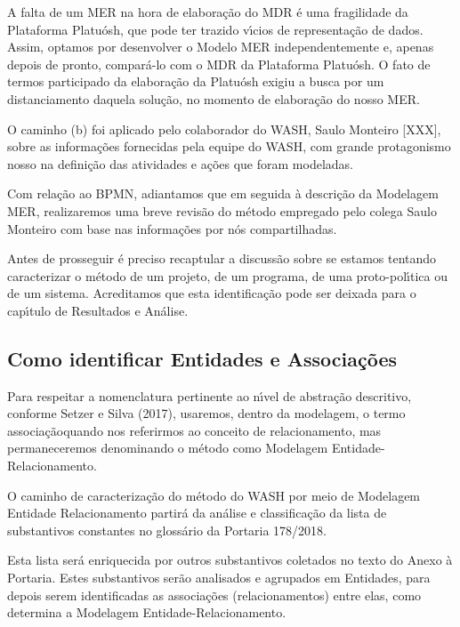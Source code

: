 \documentclass[
12pt,		%
openright,	%
twoside,  %
a4paper,			%
chapter=TITLE,		%
english,			%
french,				%
spanish,			%
brazil				%
]{USPSC-classe/USPSC}
\begin{document}
A falta de um MER na hora de elabora\c{c}\~ao do MDR \'e uma fragilidade da Plataforma Platu\'osh, que pode ter trazido v\'{\i}cios de representa\c{c}\~ao de dados. Assim, optamos por desenvolver o Modelo MER independentemente e, apenas depois de pronto, compar\'a-lo com o MDR da Plataforma Platu\'osh. O fato de termos participado da elabora\c{c}\~ao da Platu\'osh exigiu a busca por um distanciamento daquela solu\c{c}\~ao, no momento de elabora\c{c}\~ao do nosso MER.


O caminho (b) foi aplicado pelo colaborador do WASH, Saulo Monteiro [XXX], sobre as informa\c{c}\~oes fornecidas pela equipe do WASH, com grande protagonismo nosso na defini\c{c}\~ao das atividades e a\c{c}\~oes que foram modeladas.


Com rela\c{c}\~ao ao BPMN, adiantamos que em seguida \`a descri\c{c}\~ao da Modelagem MER, realizaremos uma breve revis\~ao do m\'etodo empregado pelo colega Saulo Monteiro com base nas informa\c{c}\~oes por n\'os compartilhadas.


Antes de prosseguir \'e preciso recaptular a discuss\~ao sobre se estamos tentando caracterizar o m\'etodo de um projeto, de um programa, de uma proto-pol\'{\i}tica ou de um sistema. Acreditamos que esta identifica\c{c}\~ao pode ser deixada para o cap\'{\i}tulo de Resultados e An\'alise.


\subsection[Como identificar Entidades e Associa\c{c}\~oes]{Como identificar Entidades e Associa\c{c}\~oes}\label{Como identificar Entidades e Associa\c{c}\~oes}
Para respeitar a nomenclatura pertinente ao n\'{\i}vel de abstra\c{c}\~ao descritivo, conforme  Setzer e Silva (2017), usaremos, dentro da modelagem, o termo \textquotedbl associa\c{c}\~ao\textquotedbl  quando nos referirmos ao conceito de \textquotedbl relacionamento\textquotedbl , mas permaneceremos denominando o m\'etodo como \textquotedbl Modelagem Entidade-Relacionamento\textquotedbl .


O caminho de caracteriza\c{c}\~ao do m\'etodo do WASH por meio de Modelagem Entidade Relacionamento partir\'a da an\'alise e classifica\c{c}\~ao da lista de substantivos constantes no gloss\'ario da Portaria 178/2018.


Esta lista ser\'a enriquecida por outros substantivos coletados no texto do Anexo \`a Portaria. Estes substantivos ser\~ao analisados e agrupados em Entidades, para depois serem identificadas as associa\c{c}\~oes (relacionamentos) entre elas, como determina a Modelagem Entidade-Relacionamento.
\end{document}
